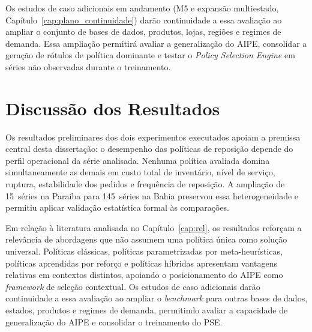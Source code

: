 Os estudos de caso adicionais em andamento (M5 e expansão multiestado, Capítulo~\ref{cap:plano_continuidade}) darão continuidade a essa avaliação ao ampliar o conjunto de bases de dados, produtos, lojas, regiões e regimes de demanda. Essa ampliação permitirá avaliar a generalização do AIPE, consolidar a geração de rótulos de política dominante e testar o \textit{Policy Selection Engine} em séries não observadas durante o treinamento.
\section{Discussão dos Resultados}

Os resultados preliminares dos dois experimentos executados apoiam a premissa central desta dissertação: o desempenho das políticas de reposição depende do perfil operacional da série analisada. Nenhuma política avaliada domina simultaneamente as demais em custo total de inventário, nível de serviço, ruptura, estabilidade dos pedidos e frequência de reposição. A ampliação de 15~séries na Paraíba para 145~séries na Bahia preservou essa heterogeneidade e permitiu aplicar validação estatística formal às comparações.

Em relação à literatura analisada no Capítulo~\ref{cap:rel}, os resultados reforçam a relevância de abordagens que não assumem uma política única como solução universal. Políticas clássicas, políticas parametrizadas por meta-heurísticas, políticas aprendidas por reforço e políticas híbridas apresentam vantagens relativas em contextos distintos, apoiando o posicionamento do AIPE como \textit{framework} de seleção contextual. Os estudos de caso adicionais darão continuidade a essa avaliação ao ampliar o \textit{benchmark} para outras bases de dados, estados, produtos e regimes de demanda, permitindo avaliar a capacidade de generalização do AIPE e consolidar o treinamento do PSE.
